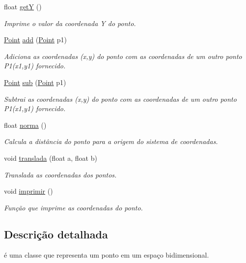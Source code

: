 \begin{DoxyCompactItemize}
float \mbox{\hyperlink{class_point_a3cccbca94719ddde353cce86ce0e2f64}{getY}} ()
\begin{DoxyCompactList}\small\item\em Imprime o valor da coordenada Y do ponto. \end{DoxyCompactList}\item 
\mbox{\hyperlink{class_point}{Point}} \mbox{\hyperlink{class_point_a9dbea84b07b0a8ec3bbb9e58b3d15899}{add}} (\mbox{\hyperlink{class_point}{Point}} p1)
\begin{DoxyCompactList}\small\item\em Adiciona as coordenadas (x,y) do ponto com as coordenadas de um outro ponto P1(x1,y1) fornecido. \end{DoxyCompactList}\item 
\mbox{\hyperlink{class_point}{Point}} \mbox{\hyperlink{class_point_a9cf2c53b0a4e6282a6712824bb4e9b00}{sub}} (\mbox{\hyperlink{class_point}{Point}} p1)
\begin{DoxyCompactList}\small\item\em Subtrai as coordenadas (x,y) do ponto com as coordenadas de um outro ponto P1(x1,y1) fornecido. \end{DoxyCompactList}\item 
float \mbox{\hyperlink{class_point_abd2618d1f505d9392893273a66e7c9b2}{norma}} ()
\begin{DoxyCompactList}\small\item\em Calcula a distância do ponto para a origem do sistema de coordenadas. \end{DoxyCompactList}\item 
void \mbox{\hyperlink{class_point_ad9676e36f3444534b609e3c68422239a}{translada}} (float a, float b)
\begin{DoxyCompactList}\small\item\em Translada as coordenadas dos pontos. \end{DoxyCompactList}\item 
void \mbox{\hyperlink{class_point_a6c0289d808f65701bc0a28f6f282c85a}{imprimir}} ()
\begin{DoxyCompactList}\small\item\em Função que imprime as coordenadas do ponto. \end{DoxyCompactList}\end{DoxyCompactItemize}


\subsection{Descrição detalhada}
é uma classe que representa um ponto em um espaço bidimensional. 

